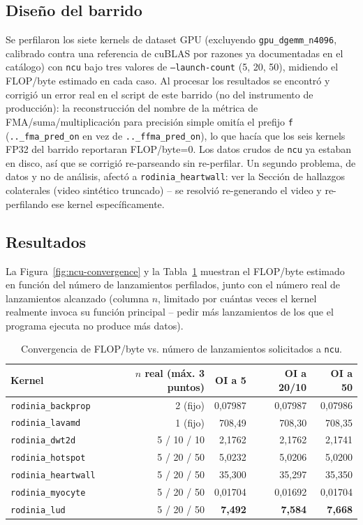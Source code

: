 \subsection{Diseño del barrido}

Se perfilaron los siete kernels de dataset GPU (excluyendo
\texttt{gpu\_dgemm\_n4096}, calibrado contra una referencia de cuBLAS por
razones ya documentadas en el catálogo) con \texttt{ncu} bajo tres valores
de \texttt{--launch-count} (5, 20, 50), midiendo el FLOP/byte estimado en
cada caso. Al procesar los resultados se encontró y corrigió un error real
en el script de este barrido (no del instrumento de producción): la
reconstrucción del nombre de la métrica de FMA/suma/multiplicación para
precisión simple omitía el prefijo \texttt{f} (\texttt{..\_fma\_pred\_on}
en vez de \texttt{..\_ffma\_pred\_on}), lo que hacía que los seis kernels
FP32 del barrido reportaran FLOP/byte=0. Los datos crudos de \texttt{ncu} ya
estaban en disco, así que se corrigió re-parseando sin re-perfilar. Un
segundo problema, de datos y no de análisis, afectó a
\texttt{rodinia\_heartwall}: ver la Sección de hallazgos colaterales
(video sintético truncado) -- se resolvió re-generando el video y
re-perfilando ese kernel específicamente.

\subsection{Resultados}

La Figura~\ref{fig:ncu-convergence} y la Tabla~\ref{tab:ncu-convergence}
muestran el FLOP/byte estimado en función del número de lanzamientos
perfilados, junto con el número real de lanzamientos alcanzado (columna
$n$, limitado por cuántas veces el kernel realmente invoca su función
principal -- pedir más lanzamientos de los que el programa ejecuta no
produce más datos).

\begin{table}[H]
\centering
\caption{Convergencia de FLOP/byte vs. número de lanzamientos solicitados a \texttt{ncu}.}
\label{tab:ncu-convergence}
\small
\begin{tabular}{@{}lrrrr@{}}
\toprule
\textbf{Kernel} & \textbf{$n$ real (máx. 3 puntos)} & \textbf{OI a 5} & \textbf{OI a 20/10} & \textbf{OI a 50} \\
\midrule
\texttt{rodinia\_backprop} & 2 (fijo) & 0{,}07987 & 0{,}07987 & 0{,}07986 \\
\texttt{rodinia\_lavamd} & 1 (fijo) & 708{,}49 & 708{,}30 & 708{,}35 \\
\texttt{rodinia\_dwt2d} & 5 / 10 / 10 & 2{,}1762 & 2{,}1762 & 2{,}1741 \\
\texttt{rodinia\_hotspot} & 5 / 20 / 50 & 5{,}0232 & 5{,}0206 & 5{,}0200 \\
\texttt{rodinia\_heartwall} & 5 / 20 / 50 & 35{,}300 & 35{,}297 & 35{,}350 \\
\texttt{rodinia\_myocyte} & 5 / 20 / 50 & 0{,}01704 & 0{,}01692 & 0{,}01704 \\
\texttt{rodinia\_lud} & 5 / 20 / 50 & \textbf{7{,}492} & \textbf{7{,}584} & \textbf{7{,}668} \\
\bottomrule
\end{tabular}
\end{table}

